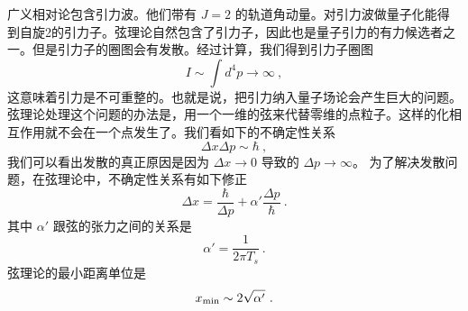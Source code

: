  
\begin{issues}
\issueNeedCite
\issueMissDepend
\end{issues}
 
 广义相对论包含引力波。他们带有 $J = 2$ 的轨道角动量。对引力波做量子化能得到自旋2的引力子。弦理论自然包含了引力子，因此也是量子引力的有力候选者之一。但是引力子的圈图会有发散。经过计算，我们得到引力子圈图
\begin{equation}
I \sim \int d^4 p \rightarrow \infty ~,
\end{equation}
这意味着引力是不可重整的。也就是说，把引力纳入量子场论会产生巨大的问题。弦理论处理这个问题的办法是，用一个一维的弦来代替零维的点粒子。这样的化相互作用就不会在一个点发生了。我们看如下的不确定性关系
\begin{equation}
\Delta x \Delta p \sim \hbar  ~,
\end{equation}
我们可以看出发散的真正原因是因为 $\Delta x \rightarrow 0$ 导致的 $\Delta p \rightarrow  \infty  $。  为了解决发散问题，在弦理论中，不确定性关系有如下修正
\begin{equation}
\Delta x  = \frac{\hbar}{\Delta p} + \alpha' \frac{\Delta p}{\hbar }~.
\end{equation}
其中 $\alpha'$ 跟弦的张力之间的关系是
\begin{equation}
\alpha ' = \frac{1}{2 \pi T_s} ~.
\end{equation}
弦理论的最小距离单位是
\begin{equation}
x_{\rm min} \sim 2 \sqrt{\alpha'}~.
\end{equation}
